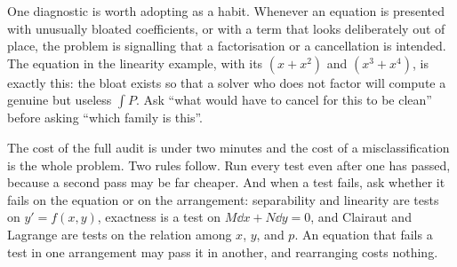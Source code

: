 One diagnostic is worth adopting as a habit. Whenever an equation is presented with unusually bloated coefficients, or with a term that looks deliberately out of place, the problem is signalling that a factorisation or a cancellation is intended. The equation in the linearity example, with its $(x+x^{2})$ and $(x^{3}+x^{4})$, is exactly this: the bloat exists so that a solver who does not factor will compute a genuine but useless $\int P$. Ask ``what would have to cancel for this to be clean'' before asking ``which family is this''.

\begin{keynote}
The cost of the full audit is under two minutes and the cost of a misclassification is the whole problem. Two rules follow. Run every test even after one has passed, because a second pass may be far cheaper. And when a test fails, ask whether it fails on the equation or on the arrangement: separability and linearity are tests on $y'=f(x,y)$, exactness is a test on $M\dd x+N\dd y=0$, and Clairaut and Lagrange are tests on the relation among $x$, $y$, and $p$. An equation that fails a test in one arrangement may pass it in another, and rearranging costs nothing.
\end{keynote}

